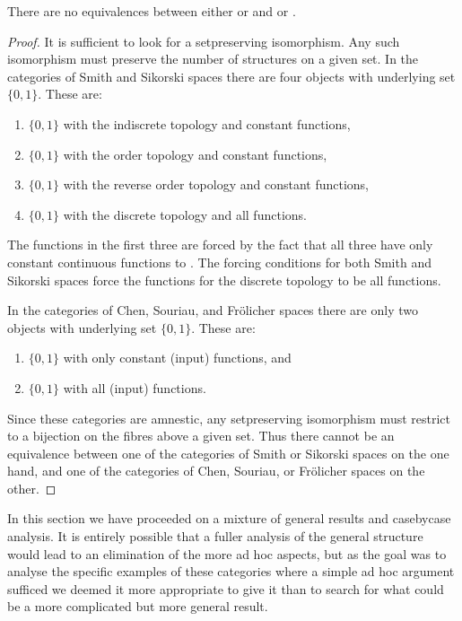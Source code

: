 \documentclass[%
a4paper,%
arxiv,%
defaults
]{myclass}
\begin{document}
\begin{proposition}
There are no equivalences between either \ccat or \dcat and \kcat or \scat.
\end{proposition}



\begin{proof}
It is sufficient to look for a set\enhyp{}preserving isomorphism.
Any such isomorphism must preserve the number of structures on a given set.
In the categories of Smith and Sikorski spaces there are four objects with underlying set \(\{0,1\}\).
These are:
%
\begin{enumerate}
\item \(\{0,1\}\) with the indiscrete topology and constant functions,
\item \(\{0,1\}\) with the order topology and constant functions,
\item \(\{0,1\}\) with the reverse order topology and constant functions,
\item \(\{0,1\}\) with the discrete topology and all functions.
\end{enumerate}
%
The functions in the first three are forced by the fact that all three have only constant continuous functions to \R.
The forcing conditions for both Smith and Sikorski spaces force the functions for the discrete topology to be all functions.

In the categories of Chen, Souriau, and Fr\"olicher spaces there are only two objects with underlying set \(\{0,1\}\).
These are:
%
\begin{enumerate}
\item \(\{0,1\}\) with only constant (input) functions, and
\item \(\{0,1\}\) with all (input) functions.
\end{enumerate}

Since these categories are amnestic, any set\enhyp{}preserving isomorphism must restrict to a bijection on the fibres above a given set.
Thus there cannot be an equivalence between one of the categories of Smith or Sikorski spaces on the one hand, and one of the categories of Chen, Souriau, or Fr\"olicher spaces on the other.
\end{proof}

In this section we have proceeded on a mixture of general results and  case\enhyp{}by\enhyp{}case analysis.
It is entirely possible that a fuller analysis of the general structure would lead to an elimination of the more ad hoc aspects, but as the goal was to analyse the specific examples of these categories where a simple ad hoc argument sufficed we deemed it more appropriate to give it than to search for what could be a more complicated but more general result.
\end{document}
